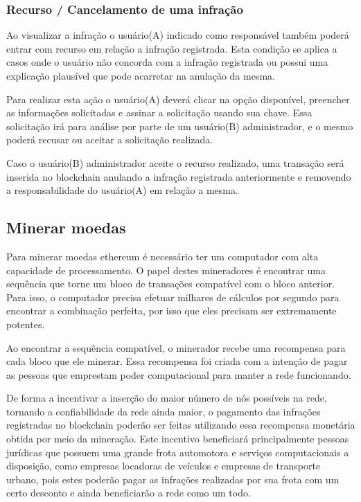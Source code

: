     
    \subsubsection{Recurso / Cancelamento de uma infração}
    
        Ao visualizar a infração o usuário(A) indicado como responsável também poderá entrar com recurso em relação a infração registrada. Esta condição se aplica a casos onde o usuário não concorda com a infração registrada ou possui uma explicação plausível que pode acarretar na anulação da mesma.
        
        Para realizar esta ação o usuário(A) deverá clicar na opção disponível, preencher as informações solicitadas e assinar a solicitação usando sua chave. Essa solicitação irá para análise por parte de um usuário(B) administrador, e o mesmo poderá recusar ou aceitar a solicitação realizada.
        
        Caso o usuário(B) administrador aceite o recurso realizado, uma transação será inserida no blockchain anulando a infração registrada anteriormente e removendo a responsabilidade do usuário(A) em relação a mesma.
        
        
\subsection{Minerar moedas}

Para minerar moedas ethereum é necessário ter um computador com alta capacidade de processamento. O papel destes mineradores é encontrar uma sequência que torne um bloco de transações compatível com o bloco anterior. Para isso, o computador precisa efetuar milhares de cálculos por segundo para encontrar a combinação perfeita, por isso que eles precisam ser extremamente potentes.

Ao encontrar a sequência compatível, o minerador recebe uma recompensa para cada bloco que ele minerar. Essa recompensa foi criada com a intenção de pagar as pessoas que emprestam poder computacional para manter a rede funcionando.

De forma a incentivar a inserção do maior número de nós possíveis na rede, tornando a confiabilidade da rede ainda maior, o pagamento das infrações registradas no blockchain poderão ser feitas utilizando essa recompensa monetária obtida por meio da mineração. Este incentivo beneficiará principalmente pessoas jurídicas que possuem uma grande frota automotora e serviços computacionais a disposição, como empresas locadoras de veículos e empresas de transporte urbano, pois estes poderão pagar as infrações realizadas por sua frota com um certo desconto e ainda beneficiarão a rede como um todo.
